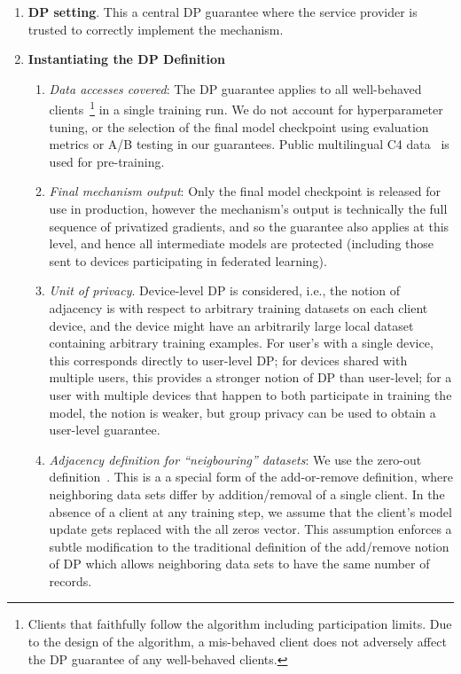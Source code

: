 \documentclass{article}
\begin{document}
\begin{enumerate}
    \item \textbf{DP setting}. This a central DP guarantee where the service provider is trusted to correctly implement the mechanism.
    \item \textbf{Instantiating the DP Definition}
     \begin{enumerate}
        \item \textit{Data accesses covered}: The DP guarantee applies to all well-behaved clients~\footnote{Clients that faithfully follow the algorithm including participation limits. Due to the design of the algorithm, a mis-behaved client does not adversely affect the DP guarantee of any well-behaved clients.} in a single training run.  We do not account for hyperparameter tuning, or the selection of the final model checkpoint using evaluation metrics or A/B testing in our guarantees. Public multilingual C4 data~\citep{raffel2020t5,xue2020mt5} is used for pre-training. 
        \item \textit{Final mechanism output}: Only the final model checkpoint is released for use in production, however the mechanism’s output is technically the full sequence of privatized gradients, and so the guarantee also applies at this level, and hence all intermediate models are protected (including those sent to devices participating in federated learning). 
        \item \textit{Unit of privacy}. Device-level DP is considered, i.e., the notion of adjacency is with respect to arbitrary training datasets on each client device, and the device might have an arbitrarily large local dataset containing arbitrary training examples. For user's with a single device, this corresponds directly to user-level DP; for devices shared with multiple users, this provides a stronger notion of DP than user-level; for a user with multiple devices that happen to both participate in training the model, the notion is weaker, but group privacy can be used to obtain a user-level guarantee.
        \item \textit{Adjacency definition for ``neigbouring'' datasets}: We use the zero-out definition~\citep{kairouz2021practical}. This is a a special form of the add-or-remove definition, where neighboring data sets differ by addition/removal of a single client. In the absence of a client at any training step, we assume that the client's model update gets replaced with the all zeros vector. This assumption enforces a subtle modification to the traditional definition of the add/remove notion of DP which allows neighboring data sets to have the same number of records.

\end{enumerate}
\end{enumerate}
\end{document}
